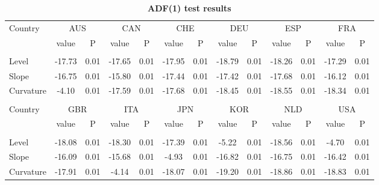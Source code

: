 \documentclass[12pt,bibliography=totoc]{article}
\begin{document}
\begin{appendices}
\begin{table}[H]
\begin{subtable}[t]{1\textwidth}
\begin{tabular}{l cc cc cc cc cc cc}
Country	&	\multicolumn{2}{c}{AUS}			&	\multicolumn{2}{c}{CAN}			&	\multicolumn{2}{c}{CHE}			&	\multicolumn{2}{c}{DEU}			&	\multicolumn{2}{c}{ESP}			&	\multicolumn{2}{c}{FRA}			\\[0.5ex] 

 & value &P & value &P& value &P & value &P& value &P & value &P\\

\hline       \\ [-1.5ex] 

Level	&	-17.73 & 0.01 	& -17.65 & 0.01 		& -17.95 & 0.01 		& -18.79 & 0.01 		& -18.26 & 0.01 		& -17.29 & 0.01	\\
Slope	&	-16.75 & 0.01 	& -15.80 & 0.01 		& -17.44 & 0.01 		& -17.42 & 0.01 		& -17.68 & 0.01 		& -16.12 & 0.01	\\
Curvature	& -4.10 & 0.01 	& -17.59 & 0.01 		& -17.68 & 0.01 		& -18.45 & 0.01 		& -18.55 & 0.01 		& -18.34 & 0.01	\\


\hline   \\ [-1.5ex]    

Country	&	\multicolumn{2}{c}{GBR}			&	\multicolumn{2}{c}{ITA}			&	\multicolumn{2}{c}{JPN}			&	\multicolumn{2}{c}{KOR}			&	\multicolumn{2}{c}{NLD}			&	\multicolumn{2}{c}{USA}			\\

 & value &P & value &P& value &P & value &P& value &P & value &P\\

\hline       \\ [-1.5ex] 

Level	&	-18.08 & 0.01 		& -18.30 & 0.01 		& -17.39 & 0.01 		& -5.22 & 0.01 		& -18.56 & 0.01 		& -4.70 & 0.01	\\
Slope	&		-16.09 & 0.01 	& -15.68 & 0.01 		& -4.93 & 0.01 		& -16.82 & 0.01 		& -16.75 & 0.01 		& -16.42 & 0.01	\\
Curvature	&	-17.91 & 0.01 	& -4.14 & 0.01 		& -18.07 & 0.01 		& -19.20 & 0.01 		& -18.86 & 0.01 		& -18.83 & 0.01	\\



\hline
\end{tabular}
\caption{\textbf{ADF(1) test results}}
\end{subtable}
\hspace{\fill}
\bigskip 


\end{table}
\end{appendices}
\end{document}
